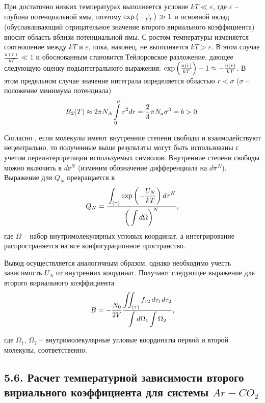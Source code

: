 При достаточно низких температурах выполняется условие $k T \ll \varepsilon$, где $\varepsilon$ -- глубина потенциальной ямы, поэтому $\exp \left( - \frac{\varepsilon}{k T} \right) \gg 1$ и основной вклад (обуславливающий отрицательное значение второго вириального коэффициента) вносит область вблизи потенциальной ямы. С ростом температуры изменяется соотношение между $k T$ и $\varepsilon$, пока, наконец, не выполняется $k T > \varepsilon$. В этом случае $\frac{u(r)}{k T} \ll 1$ и обоснованным становится Тейлоровское разложение, дающее следующую оценку подынтегрального выражения: $\exp \left( \frac{u(r)}{kT} \right) - 1 \approx - \frac{u(r)}{kT}$. В этом предельном случае значение интеграла определяется областью $r < \sigma$ ($\sigma$ -- положение минимума потенциала) 
\vverh
\begin{gather}
	B_2(T) \approx 2 \pi N_A \int\limits_0^\sigma r^2 dr = \frac{2}{3} \pi N_a \sigma^3 = b > 0. \notag
\end{gather}

Согласно \cite{meyson}, если молекулы имеют внутренние степени свободы и взаимодействуют нецентрально, то полученные выше результаты могут быть использованы с учетом переинтерпретации используемых символов. Внутренние степени свободы можно включить в $d \mathbf{r}^N$ (изменим обозначение дифференциала на $d \mathbf{\tau}^N$). Выражение для $Q_N$ превращается в 
\vverh
\begin{gather}
	Q_N = \frac{\displaystyle \strut\int_{\left( \tau \right)} \exp \left( - \frac{U_N}{k T}\right) d \mathbf{\tau}^N}{\displaystyle \left( \strut\int d \Omega \right)^N}, \notag
\end{gather}
где $\Omega$ -- набор внутримолекулярных угловых координат, а интегрирование распространяется на все конфигурационное пространство.

Вывод осуществляется аналогичным образом, однако необходимо учесть зависимость $U_N$ от внутренних координат. Получают следующее выражение для второго вириального коэффициента \cite{mayer}
\vverh
\begin{gather}
	B = - \frac{N_0}{2 V} \frac{\displaystyle \iint_{\left( \tau \right)} f_{12} \, d \tau_1 d \tau_2}{\displaystyle  \int d \Omega_1 \int \Omega_2}, \label{vircoef}
\end{gather}

где $\Omega_1$, $\Omega_2$ -- внутримолекулярные угловые координаты первой и второй молекулы, соответственно.

\subsection*{\textbf{5.6.} Расчет температурной зависимости второго вириального коэффициента для системы $Ar-CO_2$}

